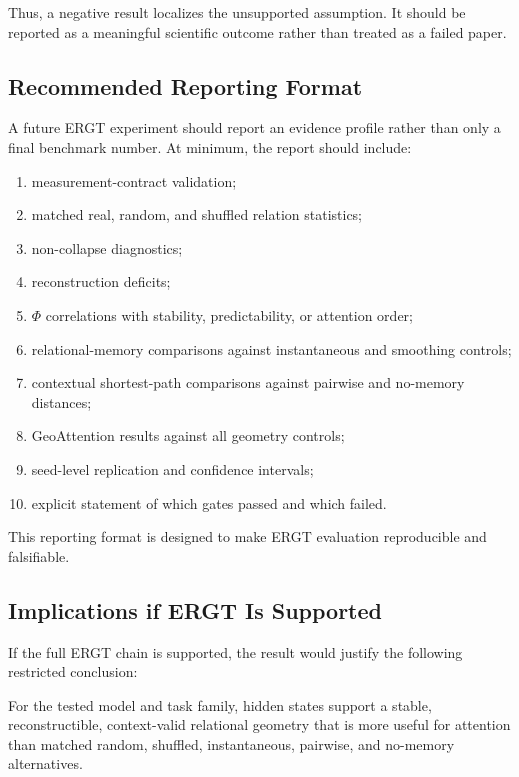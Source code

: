 \documentclass[11pt]{article}
\begin{document}
Thus, a negative result localizes the unsupported assumption. It should be reported as a meaningful scientific outcome rather than treated as a failed paper.

\subsection{Recommended Reporting Format}

A future ERGT experiment should report an evidence profile rather than only a final benchmark number. At minimum, the report should include:
\begin{enumerate}[leftmargin=2em]
    \item measurement-contract validation;
    \item matched real, random, and shuffled relation statistics;
    \item non-collapse diagnostics;
    \item reconstruction deficits;
    \item $\Phi$ correlations with stability, predictability, or attention order;
    \item relational-memory comparisons against instantaneous and smoothing controls;
    \item contextual shortest-path comparisons against pairwise and no-memory distances;
    \item GeoAttention results against all geometry controls;
    \item seed-level replication and confidence intervals;
    \item explicit statement of which gates passed and which failed.
\end{enumerate}

This reporting format is designed to make ERGT evaluation reproducible and falsifiable.

\subsection{Implications if ERGT Is Supported}

If the full ERGT chain is supported, the result would justify the following restricted conclusion:
\begin{ergtclaim}
For the tested model and task family, hidden states support a stable, reconstructible, context-valid relational geometry that is more useful for attention than matched random, shuffled, instantaneous, pairwise, and no-memory alternatives.
\end{ergtclaim}
\end{document}
